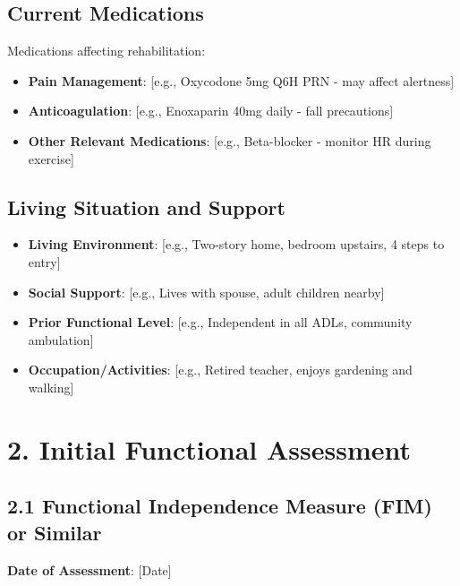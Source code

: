 \documentclass[11pt,letterpaper]{article}
\begin{document}
\subsection*{Current Medications}

Medications affecting rehabilitation:
\begin{itemize}[leftmargin=*]
    \item \textbf{Pain Management}: [e.g., Oxycodone 5mg Q6H PRN - may affect alertness]
    \item \textbf{Anticoagulation}: [e.g., Enoxaparin 40mg daily - fall precautions]
    \item \textbf{Other Relevant Medications}: [e.g., Beta-blocker - monitor HR during exercise]
\end{itemize}

\subsection*{Living Situation and Support}

\begin{itemize}[leftmargin=*]
    \item \textbf{Living Environment}: [e.g., Two-story home, bedroom upstairs, 4 steps to entry]
    \item \textbf{Social Support}: [e.g., Lives with spouse, adult children nearby]
    \item \textbf{Prior Functional Level}: [e.g., Independent in all ADLs, community ambulation]
    \item \textbf{Occupation/Activities}: [e.g., Retired teacher, enjoys gardening and walking]
\end{itemize}

\section*{2. Initial Functional Assessment}

\subsection*{2.1 Functional Independence Measure (FIM) or Similar}

\textbf{Date of Assessment}: [Date]
\end{document}
